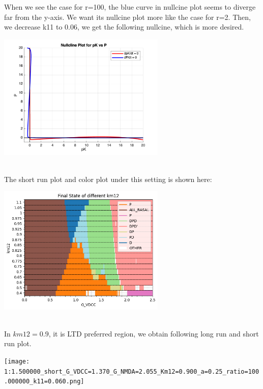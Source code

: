 \documentclass{article}
\begin{document}
When we see the case for r=100, the blue curve in nullcine plot seems to diverge far from the y-axis. We want its nullcine plot more like the case for r=2. Then, we decrease k11 to 0.06, we get the following nullcine, which is more desired.\\\begin{minipage}{\textwidth} %
    \centering
    \includegraphics[width=0.6\textwidth]{plot_k11=0.06.png} %
    \label{fig:a0.25}
\end{minipage}\\
The short run plot and color plot under this setting is shown here:\\
\begin{minipage}{\textwidth} %
    \centering
    \includegraphics[width=0.6\textwidth]{k11=0.060_color.png} %
    \label{fig:a0.25}
\end{minipage}\\
In $km12=0.9$, it is LTD preferred region, we obtain following long run and short run plot.
\\
\begin{minipage}{\textwidth} %
    \centering
    \texttt{[image: 1:1.500000\_short\_G\_VDCC=1.370\_G\_NMDA=2.055\_Km12=0.900\_a=0.25\_ratio=100.000000\_k11=0.060.png]} %
    \label{fig:a0.25}
\end{minipage}\\
\end{document}
